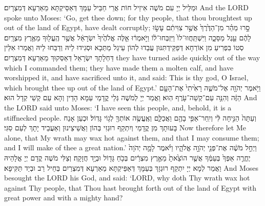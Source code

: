 {{וּמַלֵּיל יְיָ עִם מֹשֶׁה אִיזֵיל חוֹת אֲרֵי חַבֵּיל עַמָּךְ דְּאַסֵּיקְתָּא מֵאַרְעָא דְּמִצְרָיִם׃}
{And the LORD spoke unto Moses: ‘Go, get thee down; for thy people, that thou broughtest up out of the land of Egypt, have dealt corruptly;}{}
{סָ֣רוּ מַהֵ֗ר מִן־הַדֶּ֙רֶךְ֙ אֲשֶׁ֣ר צִוִּיתִ֔ם עָשׂ֣וּ לָהֶ֔ם עֵ֖גֶל מַסֵּכָ֑ה וַיִּשְׁתַּֽחֲווּ־לוֹ֙ וַיִּזְבְּחוּ־ל֔וֹ וַיֹּ֣אמְר֔וּ אֵ֤לֶּה אֱלֹהֶ֙יךָ֙ יִשְׂרָאֵ֔ל אֲשֶׁ֥ר הֶֽעֱל֖וּךָ מֵאֶ֥רֶץ מִצְרָֽיִם׃}
{סְטוֹ בִּפְרִיעַ מִן אוֹרְחָא דְּפַקֵּידְתִּנּוּן עֲבַדוּ לְהוֹן עֵיגַל מַתְּכָא וּסְגִידוּ לֵיהּ וְדַבַּחוּ לֵיהּ וַאֲמַרוּ אִלֵּין דַּחְלָתָךְ יִשְׂרָאֵל דְּאַסְּקוּךְ מֵאַרְעָא דְּמִצְרָיִם׃}
{they have turned aside quickly out of the way which I commanded them; they have made them a molten calf, and have worshipped it, and have sacrificed unto it, and said: This is thy god, O Israel, which brought thee up out of the land of Egypt.’}{}
{וַיֹּ֥אמֶר יְהֹוָ֖ה אֶל־מֹשֶׁ֑ה רָאִ֙יתִי֙ אֶת־הָעָ֣ם הַזֶּ֔ה וְהִנֵּ֥ה עַם־קְשֵׁה־עֹ֖רֶף הֽוּא׃
}
{וַאֲמַר יְיָ לְמֹשֶׁה גְּלֵי קֳדָמַי עַמָּא הָדֵין וְהָא עַם קְשֵׁי קְדָל הוּא׃}
{And the LORD said unto Moses: ‘I have seen this people, and, behold, it is a stiffnecked people.}{}
{וְעַתָּה֙ הַנִּ֣יחָה לִּ֔י וְיִֽחַר־אַפִּ֥י בָהֶ֖ם וַאֲכַלֵּ֑ם וְאֶֽעֱשֶׂ֥ה אוֹתְךָ֖ לְג֥וֹי גָּדֽוֹל׃
}
{וּכְעַן אָנַח בָּעוּתָךְ מִן קֳדָמַי וְיִתְקַף רוּגְזִי בְּהוֹן וַאֲשֵׁיצֵינוּן וְאַעֲבֵיד יָתָךְ לְעַם סַגִּי׃}
{Now therefore let Me alone, that My wrath may wax hot against them, and that I may consume them; and I will make of thee a great nation.’}{}
{וַיְחַ֣ל מֹשֶׁ֔ה אֶת־פְּנֵ֖י יְהֹוָ֣ה אֱלֹהָ֑יו וַיֹּ֗אמֶר לָמָ֤ה יְהֹוָה֙ יֶחֱרֶ֤ה אַפְּךָ֙ בְּעַמֶּ֔ךָ אֲשֶׁ֤ר הוֹצֵ֙אתָ֙ מֵאֶ֣רֶץ מִצְרַ֔יִם בְּכֹ֥חַ גָּד֖וֹל וּבְיָ֥ד חֲזָקָֽה׃
}
{וְצַלִּי מֹשֶׁה קֳדָם יְיָ אֱלָהֵיהּ וַאֲמַר לְמָא יְיָ יִתְקַף רוּגְזָךְ בְּעַמָּךְ דְּאַפֵּיקְתָּא מֵאַרְעָא דְּמִצְרַיִם בְּחֵיל רַב וּבְיַד תַּקִּיפָא׃}
{And Moses besought the LORD his God, and said: ‘LORD, why doth Thy wrath wax hot against Thy people, that Thou hast brought forth out of the land of Egypt with great power and with a mighty hand?}{}
}

